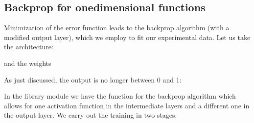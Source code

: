 \documentclass[letterpaper,10pt,english]{jupyterBook}
\begin{document}
\subsection{Backprop for one\sphinxhyphen{}dimensional functions}
\label{\detokenize{docs/interpol:backprop-for-one-dimensional-functions}}
\sphinxAtStartPar
Minimization of the error function leads to the backprop algorithm (with a modified output layer), which we employ to fit our experimental data. Let us take the architecture:

\begin{sphinxVerbatim}[commandchars=\\\{\}]
\PYG{p}{[}\PYG{p}{]}
\end{sphinxVerbatim}

\sphinxAtStartPar
and the weights

\begin{sphinxVerbatim}[commandchars=\\\{\}]
 
\end{sphinxVerbatim}

\sphinxAtStartPar
As just discussed, the output is no longer between 0 and 1:

\begin{sphinxVerbatim}[commandchars=\\\{\}]
 \PYG{p}{[}\PYG{p}{]}
 
\end{sphinxVerbatim}

\noindent{}

\sphinxAtStartPar
In the library module  we have the function for the backprop algorithm which allows for one activation function in the intermediate layers and a different one in the output layer. We carry out the training in two stages:
\end{document}
